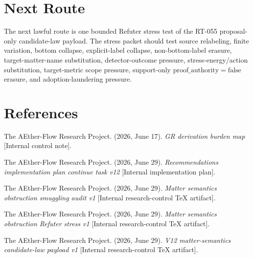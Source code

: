 \documentclass[11pt]{article}
\newcommand{\ProofAuthFalse}{\mathrm{proof\_authority=false}}
\begin{document}
\section{Next Route}

The next lawful route is one bounded Refuter stress test of the RT-055
proposal-only candidate-law payload.  The stress packet should test source
relabeling, finite variation, bottom collapse, explicit-label collapse,
non-bottom-label erasure, target-matter-name substitution, detector-outcome
pressure, stress-energy/action substitution, target-metric scope pressure,
support-only \(\ProofAuthFalse\) erasure, and adoption-laundering pressure.

\section*{References}

The AEther-Flow Research Project. (2026, June 17). \emph{GR derivation burden
map} [Internal control note].

The AEther-Flow Research Project. (2026, June 29). \emph{Recommendations
implementation plan continue task v12} [Internal implementation plan].

The AEther-Flow Research Project. (2026, June 29). \emph{Matter semantics
obstruction smuggling audit v1} [Internal research-control TeX artifact].

The AEther-Flow Research Project. (2026, June 29). \emph{Matter semantics
obstruction Refuter stress v1} [Internal research-control TeX artifact].

The AEther-Flow Research Project. (2026, June 29). \emph{V12 matter-semantics
candidate-law payload v1} [Internal research-control TeX artifact].
\end{document}
